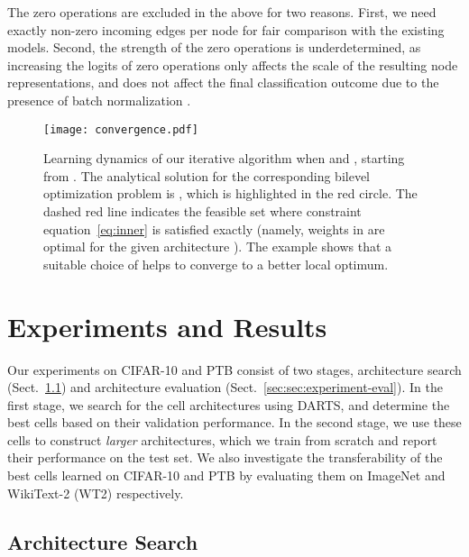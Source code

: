 \documentclass{article}
\def\eqref#1{equation~\ref{#1}}
\begin{document}
The zero operations are excluded in the above for two reasons. First, we need exactly  non-zero incoming edges per node for fair comparison with the existing models.
Second, the strength of the zero operations is underdetermined, as increasing the logits of zero operations only affects the scale of the resulting node representations, and does not affect the final classification outcome due to the presence of batch normalization \citep{ioffe2015batch}.

\begin{figure}
  \begin{minipage}[c]{0.41\textwidth}
    \texttt{[image: convergence.pdf]}
  \end{minipage}\hfill
  \begin{minipage}[c]{0.57\textwidth}
	  \caption{Learning dynamics of our iterative algorithm when  and , starting from . The analytical solution for the corresponding bilevel optimization problem is ,
	  which is highlighted in the red circle.
The dashed red line indicates the feasible set where constraint \eqref{eq:inner}
is satisfied exactly (namely, weights in  are optimal for the given architecture ).
The example shows that a suitable choice of  helps to converge to a better local optimum.}
  \end{minipage}
\end{figure}

\section{Experiments and Results}
\label{sec:experiments}

Our experiments on CIFAR-10 and PTB consist of two stages, architecture search (Sect.~\ref{sec:sec:experiment-search})
and architecture evaluation (Sect.~\ref{sec:sec:experiment-eval}).
In the first stage, we search for the cell architectures using DARTS, and determine the best cells based on their validation performance. 
In the second stage, we use these cells to construct \emph{larger} architectures, which we train from scratch and report their performance on the test set.
We also investigate the transferability of the best cells learned on CIFAR-10 and PTB by evaluating them on ImageNet and WikiText-2 (WT2) respectively.

\subsection{Architecture Search}
\label{sec:sec:experiment-search}
\end{document}
